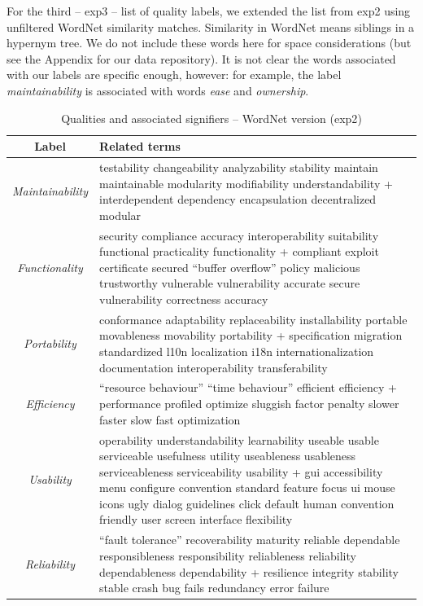 \documentclass{acm_proc_article-sp}
\begin{document}
For the third -- \textsf{exp3} -- list of quality labels, we extended the list from \textsf{exp2} using unfiltered WordNet similarity matches. Similarity in WordNet means siblings in a hypernym tree. We do not include these words here for space considerations (but see the Appendix for our data repository). It is not clear the words associated with our labels are specific enough, however: for example, the label \emph{maintainability} is associated with words \emph{ease} and \emph{ownership}.

\begin{table}
	\centering
\begin{tabular}{c|p{9cm}}
\toprule
\textbf{Label} & \textbf{Related terms} \\
\midrule
\emph{Maintainability} &
testability changeability analyzability stability maintain maintainable modularity modifiability understandability + interdependent dependency encapsulation decentralized modular\\ \hline
\emph{Functionality} &
security compliance accuracy interoperability suitability functional practicality functionality + compliant exploit certificate secured “buffer overflow” policy malicious trustworthy vulnerable vulnerability accurate secure vulnerability correctness accuracy\\ \hline
\emph{Portability} &
conformance adaptability replaceability installability portable movableness movability portability + specification migration standardized l10n localization i18n internationalization documentation interoperability transferability\\ \hline
\emph{Efficiency} &
“resource behaviour” “time behaviour” efficient efficiency + performance profiled optimize sluggish factor penalty slower faster slow fast optimization\\ \hline
\emph{Usability} &
operability understandability learnability useable usable serviceable usefulness utility useableness usableness serviceableness serviceability usability + gui accessibility menu configure convention standard feature focus ui mouse icons ugly dialog guidelines click default human convention friendly user screen interface flexibility\\ \hline
\emph{Reliability} &
“fault tolerance” recoverability maturity reliable dependable responsibleness responsibility reliableness reliability dependableness dependability + resilience integrity stability stable crash bug fails redundancy error failure\\ 
\bottomrule
\end{tabular}
	\caption{Qualities and associated signifiers – WordNet version (\textsf{exp2})}
	\label{tbl:wnsig}

\end{table}
\end{document}

